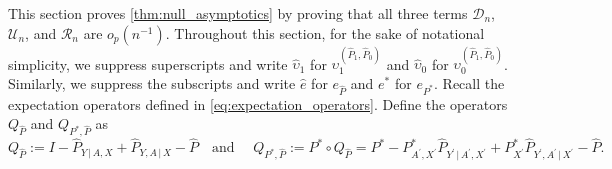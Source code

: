 \documentclass{article}
\theoremstyle{plain}
\theoremstyle{definition}
\theoremstyle{remark}
\newcommand{\ucD}{\mathscr{D}}
\newcommand{\ucU}{\mathscr{U}}
\newcommand{\ucR}{\mathscr{R}}
\newcommand{\wh}[1]{\widehat{#1}}
\newcommand{\hP}{\widehat{P}}
\newcommand{\1}{\mathbbm{1}}
\theoremstyle{plain}
\theoremstyle{definition}
\newcommand{\mymid}{\,|\,}
\newcommand{\tand}{\textrm{and }}
\begin{document}
This section proves \cref{thm:null_asymptotics} by proving that all three terms $\ucD_n$, $\ucU_n$, and $\ucR_n$ are $o_p(n^{-1})$. 
Throughout this section, for the sake of notational simplicity, we suppress superscripts and write $\wh{\upsilon}_1 $ for $ \upsilon_1^{(\hP_1, \hP_0)}$ and $\wh{\upsilon}_0 $ for $ \upsilon_0^{(\hP_1, \hP_0)}$. Similarly, we suppress the subscripts and write $\hat{e}$ for $ e_{\hP}$ and ${e}^* $ for $ e_{P^*}$. Recall the expectation operators defined in \eqref{eq:expectation_operators}. Define the operators $Q_{\hP}$ and $Q_{P^*, \hP}$ as
\begin{equation}\label{eq:Q_operators}
       Q_{\hP} := I - \hP_{Y \mymid A, X} + \hP_{Y, A \mymid X} - \hP \quad \tand \quad Q_{P^*, \hP} := P^* \circ Q_{\hP} = P^* - P^*_{A^\prime, X^\prime} \hP_{Y^\prime \mymid A^\prime, X^\prime} + P^*_{X^\prime} \hP_{Y^\prime, A^\prime \mymid X^\prime}  - \hP.
\end{equation}
\end{document}
